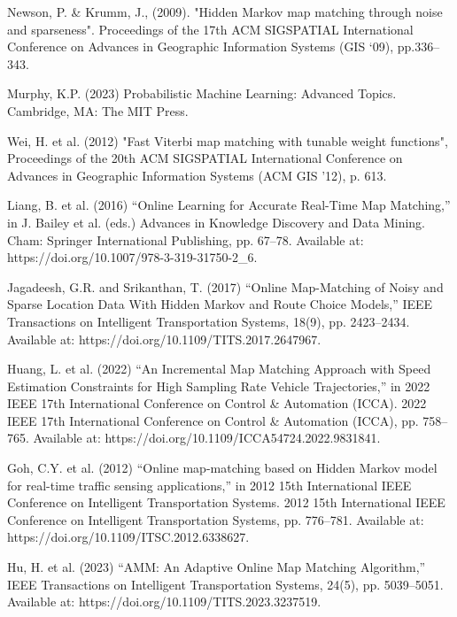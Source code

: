 \begin{thebibliography}{99}
        Newson, P. \& Krumm, J., (2009). "Hidden Markov map matching through noise and sparseness". Proceedings of the 17th ACM SIGSPATIAL International Conference on Advances in Geographic Information Systems (GIS ‘09), pp.336–343.

        Murphy, K.P. (2023) Probabilistic Machine Learning: Advanced Topics. Cambridge, MA: The MIT Press.

        Wei, H. et al. (2012) "Fast Viterbi map matching with tunable weight functions", Proceedings of the 20th ACM SIGSPATIAL International Conference on Advances in Geographic Information Systems (ACM GIS '12), p. 613.

        Liang, B. et al. (2016) “Online Learning for Accurate Real-Time Map Matching,” in J. Bailey et al. (eds.) Advances in Knowledge Discovery and Data Mining. Cham: Springer International Publishing, pp. 67–78. Available at: https://doi.org/10.1007/978-3-319-31750-2\_6.
    
        Jagadeesh, G.R. and Srikanthan, T. (2017) “Online Map-Matching of Noisy and Sparse Location Data With Hidden Markov and Route Choice Models,” IEEE Transactions on Intelligent Transportation Systems, 18(9), pp. 2423–2434. Available at: https://doi.org/10.1109/TITS.2017.2647967.


        Huang, L. et al. (2022) “An Incremental Map Matching Approach with Speed Estimation Constraints for High Sampling Rate Vehicle Trajectories,” in 2022 IEEE 17th International Conference on Control \& Automation (ICCA). 2022 IEEE 17th International Conference on Control \& Automation (ICCA), pp. 758–765. Available at: https://doi.org/10.1109/ICCA54724.2022.9831841.

    
        Goh, C.Y. et al. (2012) “Online map-matching based on Hidden Markov model for real-time traffic sensing applications,” in 2012 15th International IEEE Conference on Intelligent Transportation Systems. 2012 15th International IEEE Conference on Intelligent Transportation Systems, pp. 776–781. Available at: https://doi.org/10.1109/ITSC.2012.6338627.

        Hu, H. et al. (2023) “AMM: An Adaptive Online Map Matching Algorithm,” IEEE Transactions on Intelligent Transportation Systems, 24(5), pp. 5039–5051. Available at: https://doi.org/10.1109/TITS.2023.3237519.


\end{thebibliography}
